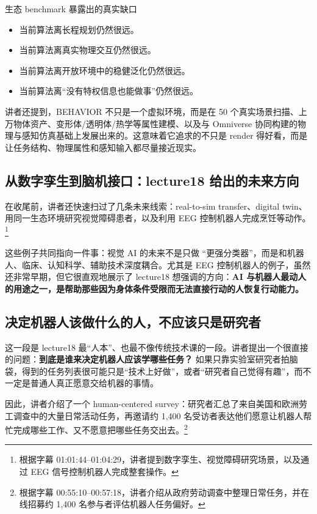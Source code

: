 \begin{importantbox}{生态 benchmark 暴露出的真实缺口}
\begin{itemize}
    \item 当前算法离长程规划仍然很远。
    \item 当前算法离真实物理交互仍然很远。
    \item 当前算法离开放环境中的稳健泛化仍然很远。
    \item 当前算法离``没有特权信息也能做事''仍然很远。
\end{itemize}
\end{importantbox}

讲者还提到，BEHAVIOR 不只是一个虚拟环境，而是在 50 个真实场景扫描、上万物体资产、变形体/透明体/热学等属性建模、以及与 Omniverse 协同构建的物理与感知仿真基础上发展出来的。这意味着它追求的不只是 render 得好看，而是让任务结构、物理属性和感知输入都尽量接近现实。

\subsection{从数字孪生到脑机接口：lecture18 给出的未来方向}

在收尾前，讲者还快速扫过了几条未来线索：real-to-sim transfer、digital twin、用同一生态环境研究视觉障碍患者，以及利用 EEG 控制机器人完成烹饪等动作。\footnote{根据字幕 01:01:44--01:04:29，讲者提到数字孪生、视觉障碍研究场景，以及通过 EEG 信号控制机器人完成整套操作。}

这些例子共同指向一件事：视觉 AI 的未来不是只做 ``更强分类器''，而是和机器人、临床、认知科学、辅助技术深度耦合。尤其是 EEG 控制机器人的例子，虽然还非常早期，但它很直观地展示了 lecture18 想强调的方向：\textbf{AI 与机器人最动人的用途之一，是帮助那些因为身体条件受限而无法直接行动的人恢复行动能力。}

\subsection{决定机器人该做什么的人，不应该只是研究者}

这一段是 lecture18 最``人本''、也最不像传统技术课的一段。讲者提出一个很直接的问题：\textbf{到底是谁来决定机器人应该学哪些任务？} 如果只靠实验室研究者拍脑袋，得到的任务列表很可能只是``技术上好做''，或者``研究者自己觉得有趣''，而不一定是普通人真正愿意交给机器的事情。

因此，讲者介绍了一个 human-centered survey：研究者汇总了来自美国和欧洲劳工调查中的大量日常活动任务，再邀请约 1,400 名受访者表达他们愿意让机器人帮忙完成哪些工作、又不愿意把哪些任务交出去。\footnote{根据字幕 00:55:10--00:57:18，讲者介绍从政府劳动调查中整理日常任务，并在线招募约 1,400 名参与者评估机器人任务偏好。}

